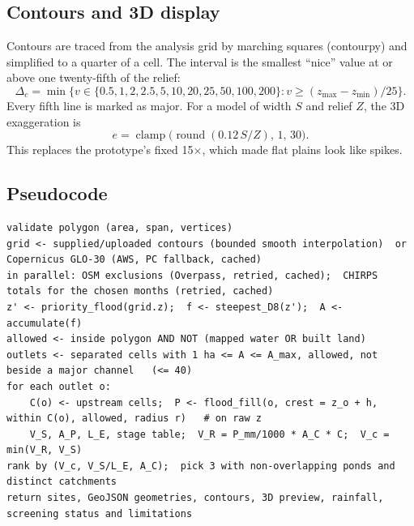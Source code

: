 \documentclass[11pt,a4paper]{article}
\begin{document}
\subsection{Contours and 3D display}
Contours are traced from the analysis grid by marching squares (contourpy) and simplified to a quarter of a cell. The interval is the smallest ``nice'' value at or above one twenty-fifth of the relief:
\begin{equation}
\Delta_c = \min\{v \in \{0.5,1,2,2.5,5,10,20,25,50,100,200\} : v \ge (z_{\max}-z_{\min})/25\}.
\end{equation}
Every fifth line is marked as major. For a model of width $S$ and relief $Z$, the 3D exaggeration is
\begin{equation}
e = \operatorname{clamp}\bigl(\operatorname{round}(0.12\,S/Z),\,1,\,30\bigr).
\label{eq:exaggeration}
\end{equation}
This replaces the prototype's fixed 15$\times$, which made flat plains look like spikes.

\subsection{Pseudocode}
\begin{lstlisting}
validate polygon (area, span, vertices)
grid <- supplied/uploaded contours (bounded smooth interpolation)  or  Copernicus GLO-30 (AWS, PC fallback, cached)
in parallel: OSM exclusions (Overpass, retried, cached);  CHIRPS totals for the chosen months (retried, cached)
z' <- priority_flood(grid.z);  f <- steepest_D8(z');  A <- accumulate(f)
allowed <- inside polygon AND NOT (mapped water OR built land)
outlets <- separated cells with 1 ha <= A <= A_max, allowed, not beside a major channel   (<= 40)
for each outlet o:
    C(o) <- upstream cells;  P <- flood_fill(o, crest = z_o + h, within C(o), allowed, radius r)   # on raw z
    V_S, A_P, L_E, stage table;  V_R = P_mm/1000 * A_C * C;  V_c = min(V_R, V_S)
rank by (V_c, V_S/L_E, A_C);  pick 3 with non-overlapping ponds and distinct catchments
return sites, GeoJSON geometries, contours, 3D preview, rainfall, screening status and limitations
\end{lstlisting}
\end{document}
